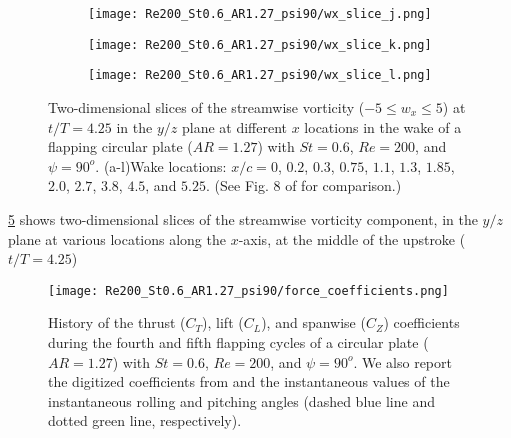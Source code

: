 \begin{figure}[H]
\begin{subfigure}[t]{0.24\textwidth}
    \caption{}
    \label{fig:baseline_wx_slices:i}
  \end{subfigure}
  \begin{subfigure}[t]{0.24\textwidth}
    \centering
    \texttt{[image: Re200\_St0.6\_AR1.27\_psi90/wx\_slice\_j.png]}
    \caption{}
    \label{fig:baseline_wx_slices:j}
  \end{subfigure}
  \begin{subfigure}[t]{0.24\textwidth}
    \centering
    \texttt{[image: Re200\_St0.6\_AR1.27\_psi90/wx\_slice\_k.png]}
    \caption{}
    \label{fig:baseline_wx_slices:k}
  \end{subfigure}
  \begin{subfigure}[t]{0.24\textwidth}
    \centering
    \texttt{[image: Re200\_St0.6\_AR1.27\_psi90/wx\_slice\_l.png]}
    \caption{}
    \label{fig:baseline_wx_slices:l}
  \end{subfigure}
  \caption{Two-dimensional slices of the streamwise vorticity ($-5 \leq w_x \leq 5$) at $t / T = 4.25$ in the $y/z$ plane at different $x$ locations in the wake of a flapping circular plate ($AR = 1.27$) with $St = 0.6$, $Re = 200$, and $\psi = 90^o$. (a-l)Wake locations: $x / c = 0$, $0.2$, $0.3$, $0.75$, $1.1$, $1.3$, $1.85$, $2.0$, $2.7$, $3.8$, $4.5$, and $5.25$. (See Fig. 8 of \citet{li_dong_2016} for comparison.)}
  \label{fig:baseline_wx_slices}
\end{figure}

\cref{fig:baseline_wx_slices} shows two-dimensional slices of the streamwise vorticity component, in the $y/z$ plane at various locations along the $x$-axis, at the middle of the upstroke ($t/T = 4.25$)

\begin{figure}[!h]
  \centering
  \texttt{[image: Re200\_St0.6\_AR1.27\_psi90/force\_coefficients.png]}
  \caption{History of the thrust ($C_T$), lift ($C_L$), and spanwise ($C_Z$) coefficients during the fourth and fifth flapping cycles of a circular plate ($AR = 1.27$) with $St = 0.6$, $Re = 200$, and $\psi = 90^o$. We also report the digitized coefficients from \cite{li_dong_2016} and the instantaneous values of the instantaneous rolling and pitching angles (dashed blue line and dotted green line, respectively).}
  \label{fig:baseline_force_coefficients}
\end{figure}

